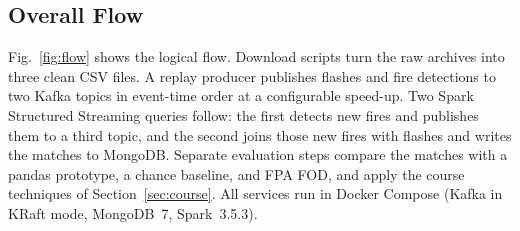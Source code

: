 \documentclass[10pt,journal,compsoc]{IEEEtran}
\begin{document}
\subsection{Overall Flow}
Fig.~\ref{fig:flow} shows the logical flow. Download scripts turn the raw archives into three clean CSV files. A replay producer publishes flashes and fire detections to two Kafka topics in event-time order at a configurable speed-up. Two Spark Structured Streaming queries follow: the first detects new fires and publishes them to a third topic, and the second joins those new fires with flashes and writes the matches to MongoDB. Separate evaluation steps compare the matches with a pandas prototype, a chance baseline, and FPA FOD, and apply the course techniques of Section~\ref{sec:course}. All services run in Docker Compose (Kafka in KRaft mode, MongoDB~7, Spark~3.5.3).
\end{document}
